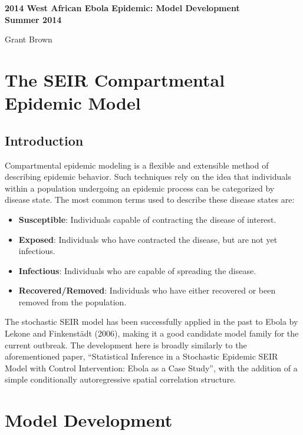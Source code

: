 \documentclass[12pt]{article}
\newcommand \noi {\noindent}
\begin{document}
\begin{center}    
    \noi \bf 2014 West African Ebola Epidemic: Model Development\\ 
    \vspace{.05in}
    \noi Summer 2014\\
    \vspace{.05in}

    \vspace{.15in}
    \noi Grant Brown\\ 

\end{center}
\section{The SEIR Compartmental Epidemic Model}
\subsection{Introduction}
Compartmental epidemic modeling is a flexible and extensible method of describing epidemic behavior.  
Such techniques rely on the idea that individuals within a population undergoing an epidemic process 
can be categorized by disease state. The most common terms used to describe these disease states are: \\ 

\begin{itemize}
    \item {\bf{Susceptible}}: Individuals capable of contracting the disease of interest. 
    \item {\bf{Exposed}}: Individuals who have contracted the disease, but are not yet infectious. 
    \item {\bf{Infectious}}: Individuals who are capable of spreading the disease.  
    \item {\bf{Recovered/Removed}}: Individuals who have either recovered or been removed from the population. 
\end{itemize}

The stochastic SEIR model has been successfully applied in the past to Ebola by Lekone and Finkenst{\"a}dt (2006), 
making it a good candidate model family for the current outbreak. The development here is broadly similarly to the 
aforementioned paper, ``Statistical Inference in a Stochastic Epidemic SEIR Model with Control Intervention: Ebola 
as a Case Study'', with the addition of a simple conditionally autoregressive spatial correlation structure. 

\section{Model Development}
\end{document}
